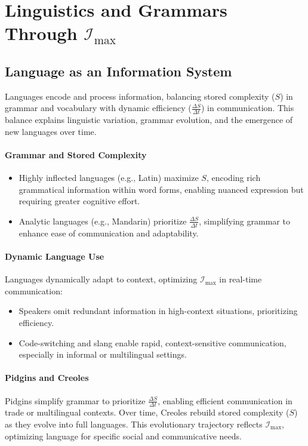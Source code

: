 \documentclass[12pt]{article}
\begin{document}
\section{Linguistics and Grammars Through \(\mathcal{I}_{\text{max}}\)}

\subsection{Language as an Information System}
Languages encode and process information, balancing stored complexity (\(S\)) in grammar and vocabulary with dynamic efficiency (\(\frac{\Delta S}{\Delta t}\)) in communication. This balance explains linguistic variation, grammar evolution, and the emergence of new languages over time.

\paragraph{Grammar and Stored Complexity}
\begin{itemize}
    \item Highly inflected languages (e.g., Latin) maximize \(S\), encoding rich grammatical information within word forms, enabling nuanced expression but requiring greater cognitive effort.
    \item Analytic languages (e.g., Mandarin) prioritize \(\frac{\Delta S}{\Delta t}\), simplifying grammar to enhance ease of communication and adaptability.
\end{itemize}

\paragraph{Dynamic Language Use}
Languages dynamically adapt to context, optimizing \(\mathcal{I}_{\text{max}}\) in real-time communication:
\begin{itemize}
    \item Speakers omit redundant information in high-context situations, prioritizing efficiency.
    \item Code-switching and slang enable rapid, context-sensitive communication, especially in informal or multilingual settings.
\end{itemize}

\paragraph{Pidgins and Creoles}
Pidgins simplify grammar to prioritize \(\frac{\Delta S}{\Delta t}\), enabling efficient communication in trade or multilingual contexts. Over time, Creoles rebuild stored complexity (\(S\)) as they evolve into full languages. This evolutionary trajectory reflects \(\mathcal{I}_{\text{max}}\), optimizing language for specific social and communicative needs.
\end{document}
